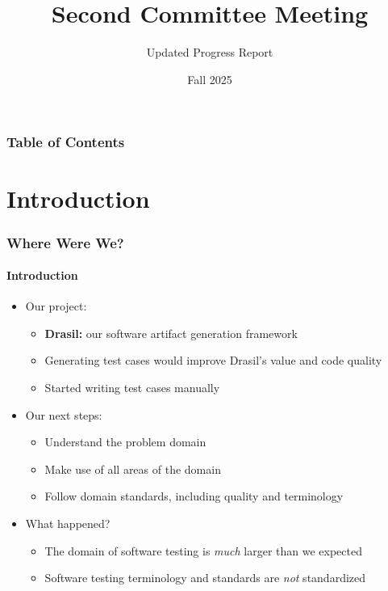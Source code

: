 \documentclass{beamer}
\title[Committee Meeting 2]{Second Committee Meeting}
\subtitle{Updated Progress Report}
\author{\thesisAuthorName{}}
\institute{McMaster University}
\date{Fall 2025}
\begin{document}

\frame{\titlepage}


\begin{frame}
    \frametitle{Table of Contents}
    \tableofcontents
\end{frame}

\section{Introduction}

\begin{frame}
    \frametitle{Where Were We?}
    \framesubtitle{Introduction}
    \begin{itemize}
        \item Our project:
              \begin{itemize}
                  \item \textbf{Drasil:} our software artifact generation framework
                  \item Generating test cases would improve Drasil's value and code quality
                  \item Started writing test cases manually
              \end{itemize}
        \item<2-> Our next steps:
              \begin{itemize}
                  \item Understand the problem domain
                  \item Make use of all areas of the domain
                  \item Follow domain standards, including quality and terminology
              \end{itemize}
        \item<3-> What happened?
              \begin{itemize}
                  \item The domain of software testing is \emph{much} larger than we expected
                  \item Software testing terminology and standards are \emph{not} standardized
              \end{itemize}
    \end{itemize}
\end{frame}
\end{document}
